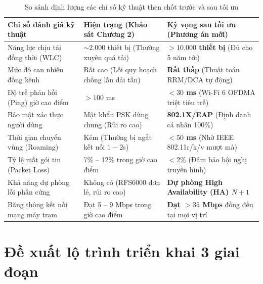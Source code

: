 \begin{table}[htbp]
\centering
\caption{So sánh định lượng các chỉ số kỹ thuật then chốt trước và sau tối ưu}
\label{tab:so_sanh_dinh_luong}
\small
\begin{tabular}{lll}
\toprule
\textbf{Chỉ số đánh giá kỹ thuật} & \textbf{Hiện trạng (Khảo sát Chương 2)} & \textbf{Kỳ vọng sau tối ưu (Phương án mới)} \\
\midrule
Năng lực chịu tải đồng thời (WLC) & $\sim 2.000$ thiết bị (Thường xuyên quá tải) & \textbf{$> 10.000$ thiết bị} (Đủ cho 5 năm tới) \\
Mức độ can nhiễu đồng kênh & Rất cao (Lỗi quy hoạch chồng lấn dải tần) & \textbf{Rất thấp} (Thuật toán RRM/DCA tự động) \\
Độ trễ phản hồi (Ping) giờ cao điểm & $> 100$ ms & \textbf{$< 30$ ms} (Wi-Fi 6 OFDMA triệt tiêu trễ) \\
Bảo mật xác thực người dùng & Mật khẩu PSK dùng chung (Rủi ro cao) & \textbf{802.1X/EAP} (Định danh cá nhân 100\%) \\
Thời gian chuyển vùng (Roaming) & Kém (Thường bị ngắt kết nối $1-2$s) & \textbf{$< 50$ ms} (Nhờ IEEE 802.11r/k/v mượt mà) \\
Tỷ lệ mất gói tin (Packet Loss) & 7\% -- 12\% trong giờ cao điểm & \textbf{$< 2\%$} (Đảm bảo hội nghị truyền hình) \\
Khả năng dự phòng lỗi phần cứng & Không có (RFS6000 đơn lẻ, rủi ro cao) & \textbf{Dự phòng High Availability (HA) $N+1$} \\
Băng thông kết nối mạng máy trạm & Đạt 5 -- 9 Mbps trong giờ cao điểm & \textbf{Đạt $> 35$ Mbps} đồng đều tại mọi vị trí \\
\bottomrule
\end{tabular}
\end{table}

\section{Đề xuất lộ trình triển khai 3 giai đoạn}

